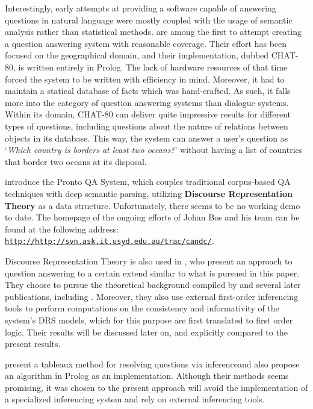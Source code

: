 \documentclass[notitlepage,twoside,a4paper]{scrreprt}
\newcommand{\abbr}{\textsf} %
\newcommand{\term}[1]{\textsf{\textbf{#1}}} %
\newcommand{\code}[1]{\texttt{#1}} %
\newcommand{\pn}{\textsf} %
\newcommand{\url}[1]{\code{http://#1}} %
\newcommand{\example}[1]{`\textit{#1}'} %
\newcommand{\prol}{\pn{Prolog}}
\theoremstyle{remark}
\theoremstyle{remark}
\theoremstyle{definition}
\theoremstyle{definition}
\begin{document}
Interestingly, early attempts at providing a software capable of answering
questions in natural language were mostly coupled with the usage of semantic
analysis rather than statistical methods.  \cite{chat} are among  the first to
attempt creating a question answering system with reasonable coverage. Their
effort has been focused on the geographical domain, and their implementation,
dubbed \pn{CHAT-80}, is written entirely in \prol. The lack of hardware
resources of that time forced the system to be written with efficiency in mind.
Moreover, it had to maintain a statical database of facts which was
hand-crafted. As such, it falls more into the category of question answering
systems than dialogue systems. Within its domain, \pn{CHAT-80} can deliver quite
impressive results for different types of questions, including questions about
the nature of relations between objects in its database.  This way, the system
can answer a user's question as \example{Which country is borders at least two
oceans?} without having a list of countries that border two oceans at its
disposal.

\cite{prontoqa} introduce the \pn{Pronto QA System}, which couples traditional
corpus-based \abbr{QA} techniques with deep semantic parsing, utilizing
\term{Discourse Representation Theory} as a data structure. Unfortunately, there
seems to be no working demo to date. The homepage of the ongoing efforts of
Johan Bos and his team can be found at the following address:
\href{http://svn.ask.it.usyd.edu.au/trac/candc/}{\url{http://svn.ask.it.usyd.edu.au/trac/candc/}}.

Discourse Representation Theory is also used in \cite{bosgabdsil}, who present
an approach to question answering to a certain extend similar to what is pursued
in this paper. They choose to pursue the theoretical background compiled by
\cite{gs:sqpa} and several later publications, including \cite{gs:q}. Moreover,
they also use external first-order inferencing tools to perform computations on
the consistency and informativity of the system's DRS models, which for this
purpose are first translated to first order logic.  Their results will be
discussed later on, and explicitly compared to the present results.

\cite{tenCate} present a tableaux method for resolving questions via inferenceand also
propose an algorithm in \prol{} as an implementation. Although their methods
seems promising, it was chosen to
the present approach will avoid the implementation of a specialized inferencing
system and rely on external inferencing tools.
\end{document}
